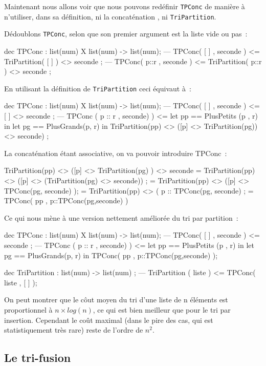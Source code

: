 Maintenant nous allons voir que nous pouvons redéfinir \texttt{TPConc} de
manière à n'utiliser, dans sa définition, ni la concaténation , ni
\texttt{TriPartition}.

Dédoublons \texttt{TPConc}, selon que son premier argument est la liste vide ou pas~:
\begin{verbatimtab}
dec TPConc : list(num) X list(num) -> list(num);
--- TPConc( [ ]  , seconde ) <= TriPartition( [ ] ) <> seconde ;
--- TPConc(  p::r , seconde ) <= TriPartition( p::r ) <> seconde ;
\end{verbatimtab}
En utilisant la définition de \texttt{TriPartition} ceci équivaut à~:
\begin{verbatimtab}
dec TPConc : list(num) X list(num) -> list(num);
--- TPConc( [ ]  , seconde ) <= [ ] <> seconde ;
--- TPConc ( p :: r , seconde) )  
           <=  let pp == PlusPetits (p , r)
            in let pg == PlusGrands(p, r)
               in TriPartition(pp) <> ([p] <> TriPartition(pg)) <> seconde) ;
\end{verbatimtab}
La concaténation étant associative, on va pouvoir introduire TPConc~:
\begin{verbatimtab}
TriPartition(pp) <> ([p] <> TriPartition(pg) )  <> seconde
        = TriPartition(pp) <> ([p] <> (TriPartition(pg)   <> seconde)) ;
        = TriPartition(pp) <> ([p] <> TPConc(pg, seconde) );
        = TriPartition(pp) <> ( p :: TPConc(pg, seconde) ;
        = TPConc( pp , p::TPConc(pg,seconde) )
\end{verbatimtab}
Ce qui nous mène à une version nettement améliorée du tri par partition~:
\begin{verbatimtab}
dec TPConc : list(num) X list(num) -> list(num);
--- TPConc( [ ]  , seconde ) <=  seconde ;
--- TPConc ( p :: r , seconde) )  
           <=  let  pp == PlusPetits (p , r)
             in let pg == PlusGrands(p, r)
             in TPConc( pp , p::TPConc(pg,seconde) );

dec TriPartition : list(num) -> list(num) ;
--- TriPartition ( liste ) <= TPConc( liste , [ ] );
\end{verbatimtab}
On peut montrer que le c\^out moyen du tri d'une liste de n éléments
est proportionnel à $n \times log(n)$, ce qui est bien meilleur que pour le
tri par insertion. Cependant le co\^ut maximal (dans le pire des cas,
qui est statistiquement très rare) reste de l'ordre de $n^2$.

\subsection{Le tri-fusion}


